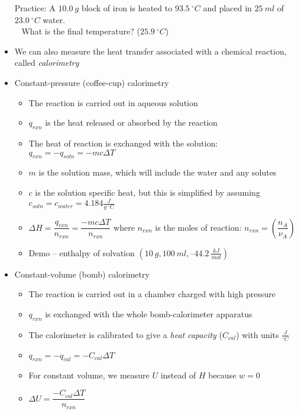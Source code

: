 \documentclass[12pt, openany, letterpaper]{memoir}
\begin{document}
\begin{itemize}
	      Practice: A $10.0~g$ block of iron is heated to $93.5~^\circ C$ and placed in $25~ml$ of $23.0~^\circ C$ water.\\
	      ~\hphantom{Practice:} What is the final temperature? ($25.9~^\circ C$)
	\item We can also measure the heat transfer associated with a chemical reaction, called \emph{calorimetry}
	\item Constant-pressure (coffee-cup) calorimetry
	      \begin{itemize}
		      \item The reaction is carried out in aqueous solution
		      \item $q_{rxn}$ is the heat released or absorbed by the reaction
		      \item The heat of reaction is exchanged with the solution: $q_{rxn} = -q_{soln} = -mc\Delta T$
		      \item $m$ is the solution mass, which will include the water and any solutes
		      \item $c$ is the solution specific heat, but this is simplified by assuming $c_{soln}=c_{water}=4.184\frac{J}{g~^\circ C}$
		      \item $\Delta H = \dfrac{q_{rxn}}{n_{rxn}} = \dfrac{-mc\Delta T}{n_{rxn}}$ where $n_{rxn}$ is the moles of reaction: $n_{rxn}=\left(\dfrac{n_A}{\nu_A}\right)$
		      \item Demo --  enthalpy of solvation $\left(10~g, 100~ml, –44.2~\frac{kJ}{mol}\right)$
	      \end{itemize}
	\item Constant-volume (bomb) calorimetry
	      \begin{itemize}
		      \item The reaction is carried out in a chamber charged with high pressure 
		      \item $q_{rxn}$ is exchanged with the whole bomb-calorimeter apparatus
		      \item The calorimeter is calibrated to give a \emph{heat capacity} ($C_{cal}$) with units $\frac{J}{^\circ C}$
		      \item $q_{rxn}=-q_{cal}=-C_{cal}\Delta T$
		      \item For constant volume, we measure $U$ instead of $H$ because $w=0$
		      \item $\Delta U = \dfrac{-C_{cal}\Delta T}{n_{rxn}}$
	      \end{itemize}
\end{itemize}
\end{document}
